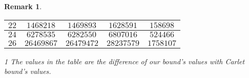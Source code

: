 \documentclass{article}
\newcommand{\0}{\textbf{0}}
\newcommand{\1}{\textbf{1}}
\newcommand{\TRACE}{\operatorname{Tr}_1^k}
\theoremstyle{plain}
\newtheorem{remark}{Remark}
\begin{document}
\begin{remark}
\begin{table}
\begin{threeparttable}
\begin{tabular}{|c|c|c|c|c|}
                    $22 $ &  $ 1468218     $       & $ 1469893  $     & $ 1628591  $     & $  158698  $ \\  \hline     
                    $24 $ &  $ 6278535     $       & $ 6282550  $     & $ 6807016  $     & $  524466  $ \\  \hline     
                    $26 $ &  $ 26469867    $       & $ 26479472 $     & $ 28237579 $     & $  1758107 $ \\  \hline     
                \end{tabular}       
                \begin{tablenotes}
                    \footnotesize
                    \item[1] The values in the table are the difference of our bound's values with  Carlet bound's values.
                \end{tablenotes}                                     
            \end{threeparttable}
            \label{table:MyTableLabel}                              
        \end{table}    
     \end{remark}
    
    
    
   





\end{document}
